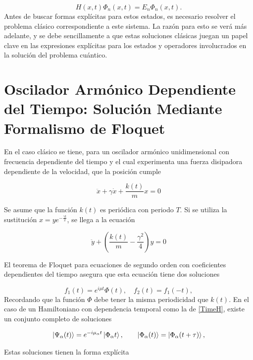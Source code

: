 \documentclass[10pt,a4paper]{report}
\begin{document}
\begin{equation}
H(x,t)\Phi_n(x,t)=E_n\Phi_n(x,t).
\end{equation} Antes de buscar formas explícitas para estos estados, es necesario resolver el problema clásico correspondiente a este sistema. La razón para esto se verá más adelante, y se debe sencillamente a que estas soluciones clásicas juegan un papel clave en las expresiones explícitas para los estados y operadores involucrados en la solución del problema cuántico.

\section{Oscilador Armónico Dependiente del Tiempo: Solución Mediante Formalismo de Floquet}

En el caso clásico \cite{HanngiFM} se tiene, para un oscilador armónico unidimensional con frecuencia dependiente del tiempo y el cual experimenta una fuerza disipadora dependiente de la velocidad, que la posición cumple

\begin{equation}
\ddot{x}+\gamma\dot{x}+\frac{k(t)}{m}x=0
\end{equation}

Se asume que la función $k(t)$ es periódica con periodo $T$. Si se utiliza la sustitución $x=ye^{-\frac{\gamma t}{2}}$, se llega a la ecuación

\begin{equation}
\ddot{y} +(\frac{k(t)}{m}-\frac{\gamma^2}{4})y=0
\end{equation}

El teorema de Floquet para ecuaciones de segundo orden con
coeficientes dependientes del tiempo \cite{HanngiFM} asegura
que esta ecuación tiene dos soluciones

\begin{equation}
f_1(t) = e^{i\mu t}\Phi(t), \quad f_2(t)=f_1(-t),
\end{equation}
Recordando que la función $\Phi$ debe tener la misma periodicidad que
$k(t)$. En el caso de un Hamiltoniano con dependencia temporal como la de \eqref{TimeH}, existe un conjunto completo de soluciones
\cite{BarnettSD}

\begin{equation}
\Ket{\Psi_\alpha (t)} = e^{-i\mu_\alpha t}\Ket{\Phi_\alpha t}, \qquad \Ket{\Phi_\alpha (t)}=\Ket{\Phi_\alpha (t+\tau)},
\end{equation}

Estas soluciones tienen la forma explícita\cite{BrownPT}
\end{document}
